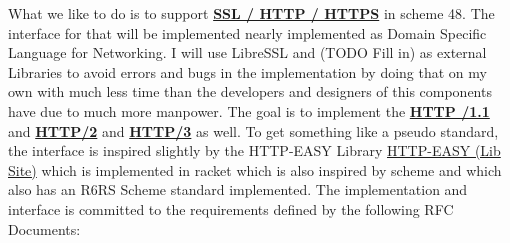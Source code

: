\documentclass[10pt,a4paper,english]{article}
\begin{document}
\begin{flushleft}
What we like to do is to support \textbf{\underline {SSL / HTTP  / HTTPS}} in scheme 48. The interface for that will be implemented nearly implemented as Domain Specific Language for Networking. I will use LibreSSL and (TODO Fill in) as external Libraries to avoid errors and bugs in the implementation by doing that on my own with much less time than the developers and designers of this components have due to much more manpower.  
The goal is to implement the \textbf{\underline {HTTP /1.1}} and \textbf{\underline {HTTP/2}} and \textbf{\underline {HTTP/3}} as well. To get something  like a pseudo standard,  the interface is inspired slightly by the HTTP-EASY Library
\href{https://pkgs.racket-lang.org/package/http-easy-lib}{HTTP-EASY (Lib Site)}  which is implemented in racket which is also inspired by scheme and which also has an R6RS Scheme standard implemented. 
The implementation and interface is committed to the requirements defined by the following RFC Documents:
\end{flushleft}
\end{document}
